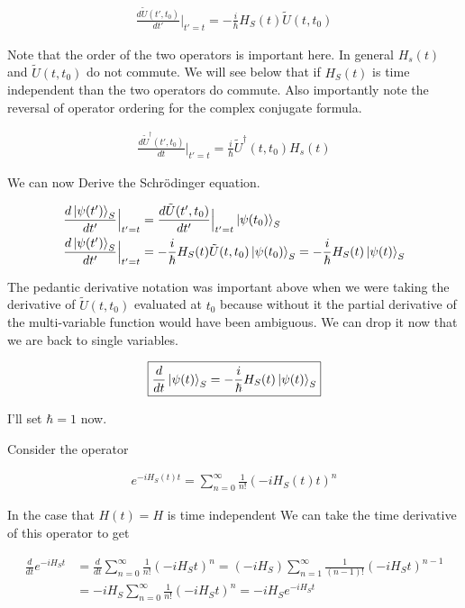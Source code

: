 \documentclass[12pt]{article}
\begin{document}
\begin{align}
\boxed{\frac{d \tilde{U}(t',t_0)}{d t'}\Bigr \rvert_{t'=t} = -\frac{i}{\hbar} H_S(t) \tilde{U}(t,t_0)}
\end{align}


Note that the order of the two operators is important here. In general $H_s(t)$ and $\tilde{U}(t,t_0)$ do not commute. We will see below that if $H_S(t)$ is time independent than the two operators do commute. Also importantly note the reversal of operator ordering for the complex conjugate formula.

\begin{align}
\frac{d \tilde{U}^{\dag}(t',t_0)}{d t} \Bigr \rvert_{t'=t} = \frac{i}{\hbar} \tilde{U}^{\dag}(t,t_0) H_s(t)
\end{align}

We can now Derive the Schr{\"o}dinger equation.

\begin{align}
\frac{d \ket{\psi(t')}_S}{d t'} \Bigr \rvert_{t'=t} &= \frac{d \tilde{U}(t',t_0)}{dt'} \Bigr \rvert_{t'=t} \ket{\psi(t_0)}_S\\
\frac{d \ket{\psi(t')}_S}{d t'} \Bigr \rvert_{t'=t} &= -\frac{i}{\hbar} H_S(t) \tilde{U}(t,t_0) \ket{\psi(t_0)}_S = -\frac{i}{\hbar} H_S(t)\ket{\psi(t)}_S
\end{align}

The pedantic derivative notation was important above when we were taking the derivative of $\tilde{U}(t,t_0)$ evaluated at $t_0$ because without it the partial derivative of the multi-variable function would have been ambiguous. We can drop it now that we are back to single variables.

\begin{align}
\boxed{\frac{d}{d t} \ket{\psi(t)}_S = -\frac{i}{\hbar} H_S(t) \ket{\psi(t)}_S}
\end{align}

I'll set $\hbar = 1$ now.

Consider the operator

\begin{align}
e^{-i H_S(t) t} = \sum_{n=0}^{\infty} \frac{1}{n!} (-i H_S(t) t)^n
\end{align}

In the case that $H(t)=H$ is time independent We can take the time derivative of this operator to get

\begin{align}
\frac{d}{dt} e^{-iH_S t} &= \frac{d}{dt} \sum_{n=0}^{\infty} \frac{1}{n!} (-iH_S t)^n = (-iH_S)\sum_{n=1}^{\infty} \frac{1}{(n-1)!} (-iH_S t)^{n-1}\\
&= -iH_S\sum_{n=0}^{\infty} \frac{1}{n!} (-iH_S t)^{n} = -iH_S e^{-iH_S t} 
\end{align}
\end{document}
